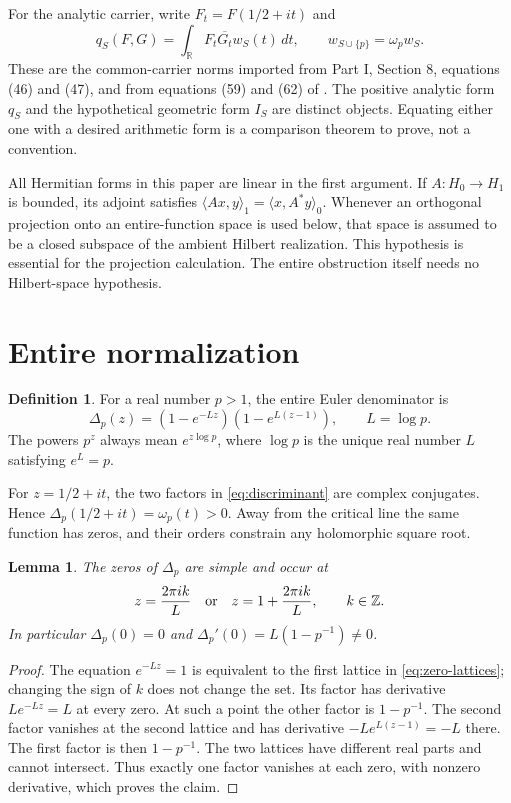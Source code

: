 \documentclass[11pt,letterpaper]{article}
\newtheorem{lemma}[theorem]{Lemma}
\theoremstyle{definition}
\newtheorem{definition}[theorem]{Definition}
\theoremstyle{remark}
\newcommand{\R}{\mathbb R}
\newcommand{\Z}{\mathbb Z}
\begin{document}
For the analytic carrier, write $F_t=F(1/2+it)$ and
\begin{equation}
 q_S(F,G)=\int_\R F_t\overline{G_t}w_S(t)\,dt,
 \qquad w_{S\cup\{p\}}=\omega_p w_S.
 \label{eq:carrier-norms}
\end{equation}
These are the common-carrier norms imported from Part I,
Section 8, equations (46) and (47), and from equations (59)
and (62) of \cite{CCM24}.
The positive analytic form $q_S$ and the hypothetical geometric
form $I_S$ are distinct objects. Equating either one with a desired
arithmetic form is a comparison theorem to prove, not a convention.

All Hermitian forms in this paper are linear in the first argument.
If $A:H_0\to H_1$ is bounded, its adjoint satisfies
$\langle Ax,y\rangle_1=\langle x,A^*y\rangle_0$.
Whenever an orthogonal projection onto an entire-function space is
used below, that space is assumed to be a closed subspace of the
ambient Hilbert realization. This hypothesis is essential for the
projection calculation. The entire obstruction itself needs no
Hilbert-space hypothesis.

\section{Entire normalization}
\label{sec:entire}

\begin{definition}
\label{def:polarization-obstructions:discriminant}
For a real number $p>1$, the entire Euler denominator is
\begin{equation}
 \Delta_p(z)=(1-e^{-Lz})(1-e^{L(z-1)}),\qquad L=\log p.
 \label{eq:discriminant}
\end{equation}
The powers $p^z$ always mean $e^{z\log p}$, where $\log p$
is the unique real number $L$ satisfying $e^L=p$.
\end{definition}

For $z=1/2+it$, the two factors in \eqref{eq:discriminant} are
complex conjugates. Hence $\Delta_p(1/2+it)=\omega_p(t)>0$. Away from the
critical line the same function has zeros, and their orders constrain
any holomorphic square root.

\begin{lemma}
\label{lem:simple-zero}
The zeros of $\Delta_p$ are simple and occur at
\begin{equation}
 z=\frac{2\pi i k}{L}\quad\hbox{or}\quad
 z=1+\frac{2\pi i k}{L},\qquad k\in\Z.
 \label{eq:zero-lattices}
\end{equation}
In particular $\Delta_p(0)=0$ and $\Delta_p'(0)=L(1-p^{-1})\ne0$.
\end{lemma}
\begin{proof}
The equation $e^{-Lz}=1$ is equivalent to the first lattice in
\eqref{eq:zero-lattices}; changing the sign of $k$ does not change
the set. Its factor has derivative $Le^{-Lz}=L$ at every zero.
At such a point the other factor is $1-p^{-1}$.
The second factor vanishes at the second lattice and has derivative
$-Le^{L(z-1)}=-L$ there. The first factor is then $1-p^{-1}$.
The two lattices have different real parts and cannot intersect.
Thus exactly one factor vanishes at each zero, with nonzero
derivative, which proves the claim.
\end{proof}
\end{document}
